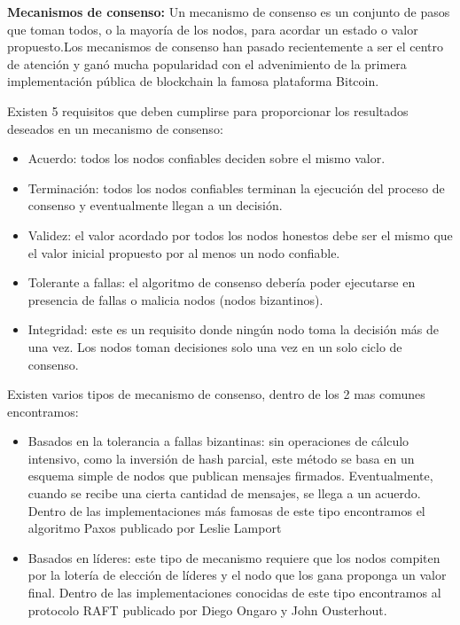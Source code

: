 \textbf{Mecanismos de consenso:}  Un mecanismo de consenso es un conjunto de pasos que toman todos, o la mayoría de los nodos, para acordar un estado o valor propuesto\cite{swanson2015consensus}.Los mecanismos de consenso han pasado recientemente a ser el centro de atención y ganó mucha popularidad con el advenimiento de la primera implementación pública de blockchain la famosa plataforma Bitcoin.

Existen 5 requisitos que deben cumplirse para proporcionar los resultados deseados en un mecanismo de consenso:

\begin{itemize}
\item Acuerdo: todos los nodos confiables deciden sobre el mismo valor.
\item Terminación: todos los nodos confiables terminan la ejecución del proceso de consenso y eventualmente llegan a un decisión.
\item Validez: el valor acordado por todos los nodos honestos debe ser el mismo que el valor inicial propuesto por al menos un nodo confiable.
\item Tolerante a fallas: el algoritmo de consenso debería poder ejecutarse en presencia de fallas o malicia nodos (nodos bizantinos).
\item Integridad: este es un requisito donde ningún nodo toma la decisión más de una vez. Los nodos toman decisiones solo una vez en un solo ciclo de consenso.
\end{itemize}

Existen varios tipos de mecanismo de consenso, dentro de los 2 mas comunes encontramos:
\begin{itemize}
\item Basados en la tolerancia a fallas bizantinas: sin operaciones de cálculo intensivo, como la inversión de hash parcial, este método se basa en un esquema simple de nodos que publican mensajes firmados. Eventualmente, cuando se recibe una cierta cantidad de mensajes, se llega a un acuerdo. Dentro de las implementaciones más famosas de este tipo encontramos el  algoritmo Paxos publicado por Leslie Lamport \cite{lamport2001paxos}

\item Basados en líderes: este tipo de mecanismo requiere que los nodos compiten por la lotería de elección de líderes y el nodo que los gana proponga un valor final. Dentro de las implementaciones conocidas de este tipo encontramos al protocolo RAFT publicado por Diego Ongaro y John Ousterhout.\cite{ongaro2015raft}
\end{itemize}

